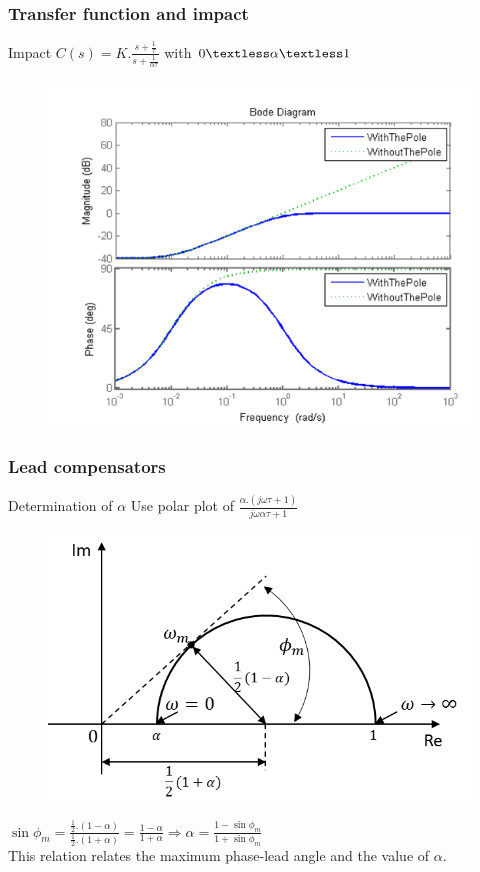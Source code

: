 \begin{frame}
	\frametitle{Transfer function and impact}
	\begin{block}{Impact}
		$C(s) = K.\frac{s + \frac{1}{\tau}}{s + \frac{1}{\alpha\tau}}$ with $0 \textless  \alpha  \textless  1$
		\begin{figure}
			\centering
			\includegraphics[width=0.5
			\linewidth]{leadcompensator1}
		\end{figure}
	\end{block}
\end{frame}

\begin{frame}	
	\frametitle{Lead compensators}
	\begin{block}{Determination of $\alpha$}
		Use polar plot of 
		$\frac{\alpha.(j\omega\tau + 1)}{j\omega\alpha\tau + 1}$	
		\begin{figure}
			\centering
			\includegraphics[width=0.5
			\linewidth]{leadcompalphabepalen}
		\end{figure}
		$\sin\phi_m = \frac{\frac{1}{2}.(1 - \alpha)}{\frac{1}{2}.(1 + \alpha)} = \frac{1 - \alpha}{1 + \alpha} \Rightarrow \alpha = \frac{1 - \sin\phi_m}{1 + \sin\phi_m}$ \\
		This relation relates the maximum phase-lead angle and the value of $\alpha$. 
	\end{block}
\end{frame}

